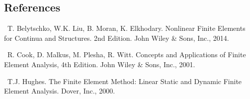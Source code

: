\documentclass[11pt]{report}
\numberwithin{equation}{section}
\newcounter{sectrefs}
\begin{document}
\subsection {References}
\small

~T. Belytschko, W.K. Liu, B. Moran, K. Elkhodary.
Nonlinear Finite Elements for Continua and Structures. 2nd Edition. John Wiley \& Sons, Inc., 2014.

\medskip
{}~R. Cook, D. Malkus, M. Plesha, R. Witt.
Concepts and Applications of Finite Element Analysis, 4th Edition. John Wiley \& Sons, Inc., 2001.

\medskip
{}~T.J. Hughes.
The Finite Element Method: Linear Static and Dynamic Finite Element Analysis. Dover, Inc., 2000.
\end{document}
